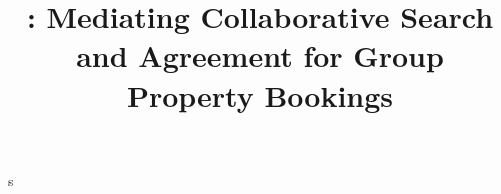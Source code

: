\documentclass[sigconf,review,anonymous]{acmart}
\title{\tool: Mediating Collaborative Search and Agreement for Group Property Bookings}
\begin{document}
\begin{abstract}

\end{abstract}

\maketitle










s
\end{document}
